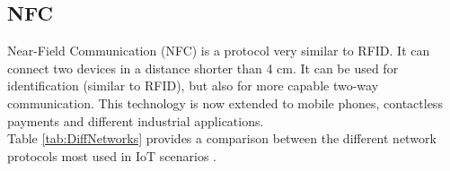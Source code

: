 \subsection{NFC}
Near-Field Communication (NFC) is a protocol very similar to RFID. It can connect two devices in a distance shorter than 4 cm. It can be used for identification (similar to RFID), but also for more capable two-way communication. This technology is now extended to mobile phones, contactless payments and different industrial applications.\\

Table \ref{tab:DiffNetworks} provides a comparison between the different network protocols most used in IoT scenarios \cite{IEEE:protocols}.

\begin{table}[]
\centering
    \caption{Comparison between network protocols}
    \label{tab:DiffNetworks}
\end{table}